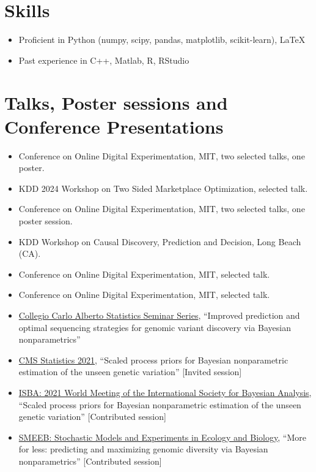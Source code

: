 \documentclass[10pt, a4paper]{article}
\newcommand{\years}[1]{\marginnote{\scriptsize #1}}
\begin{document}
\section*{Skills}
\begin{itemize}
	\item Proficient in Python (numpy, scipy, pandas, matplotlib, scikit-learn), \LaTeX
	\item Past experience in C++, Matlab, R, RStudio
\end{itemize}
\section*{Talks, Poster sessions and Conference Presentations}
\years{2024}
\begin{itemize}
	\item Conference on Online Digital Experimentation, MIT, two selected talks, one poster.
	\item KDD 2024 Workshop on Two Sided Marketplace Optimization, selected talk.
	\item Conference on Online Digital Experimentation, MIT, two selected talks, one poster session.
\end{itemize}
\years{2023}
\begin{itemize}
	\item KDD Workshop on Causal Discovery, Prediction and Decision, Long Beach (CA).
	\item Conference on Online Digital Experimentation, MIT, selected talk.
\end{itemize}
\years{2022}
\begin{itemize}
	\item Conference on Online Digital Experimentation, MIT, selected talk.
\end{itemize}
\years{2021}
\begin{itemize}
	\item \href{https://www.carloalberto.org/event/lorenzo-masoero-amazon/}{Collegio Carlo Alberto Statistics Seminar Series}, ``{Improved prediction and optimal sequencing strategies for genomic variant discovery via Bayesian nonparametrics}''  
	\item \href{http://www.cmstatistics.org/CMStatistics2021/speakers.php}{CMS Statistics 2021}, ``{Scaled process priors for Bayesian nonparametric
estimation of the unseen genetic variation}'' [Invited session] 
	\item \href{https://events.stat.uconn.edu/ISBA2021/}{ISBA: 2021 World Meeting of the International Society for Bayesian Analysis}, ``{Scaled process priors for Bayesian nonparametric
estimation of the unseen genetic variation}'' [Contributed session] 
	\item \href{https://liphlab.github.io/SMEEB2021/}{SMEEB: Stochastic Models and Experiments in Ecology and Biology}, ``{More for less: predicting and maximizing genomic diversity via Bayesian nonparametrics}'' [Contributed session] 
\end{itemize}
\end{document}

